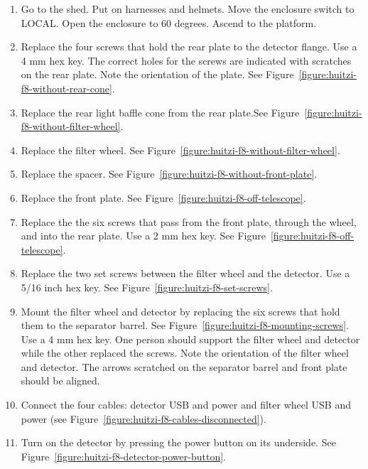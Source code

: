 \begin{enumerate}

    \item Go to the shed. Put on harnesses and helmets. Move the enclosure switch to LOCAL. Open the enclosure to 60 degrees. Ascend to the platform.

    \item Replace the four screws that hold the rear plate to the detector flange. Use a 4 mm hex key. The correct holes for the screws are indicated with scratches on the rear plate. Note the orientation of the plate. See Figure~\ref{figure:huitzi-f8-without-rear-cone}.

    \item Replace the rear light baffle cone from the rear plate.See Figure~\ref{figure:huitzi-f8-without-filter-wheel}. 

    \item Replace the filter wheel. See Figure~\ref{figure:huitzi-f8-without-filter-wheel}.

    \item Replace the spacer. See Figure~\ref{figure:huitzi-f8-without-front-plate}.
    
    \item Replace the front plate. See Figure~\ref{figure:huitzi-f8-off-telescope}.
    
    \item Replace the the six screws that pass from the front plate, through the wheel, and into the rear plate. Use a 2 mm hex key. See Figure~\ref{figure:huitzi-f8-off-telescope}.

    \item Replace the two set screws between the filter wheel and the detector. Use a 5/16 inch hex key. See Figure~\ref{figure:huitzi-f8-set-screws}.

    \item Mount the filter wheel and detector by replacing the six screws that hold them to the separator barrel. See Figure~\ref{figure:huitzi-f8-mounting-screws}. Use a 4 mm hex key. One person should support the filter wheel and detector while the other replaced the screws. Note the orientation of the filter wheel and detector. The arrows scratched on the separator barrel and front plate should be aligned.

   \item Connect the four cables: detector USB and power and filter wheel USB and power (see Figure~\ref{figure:huitzi-f8-cables-disconnected}).

   \item Turn on the detector by pressing the power button on its underside. See Figure~\ref{figure:huitzi-f8-detector-power-button}.

\end{enumerate}

